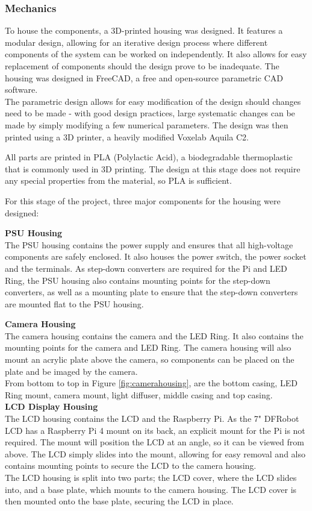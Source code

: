 \subsubsection{Mechanics} \label{sec:mechanics}
To house the components, a 3D-printed housing was designed. It features a modular design, allowing for an iterative design process
where different components of the system can be worked on independently. It also allows for easy replacement of components
should the design prove to be inadequate. The housing was designed in FreeCAD\cite{freecad}, a free and open-source parametric CAD software. \\
The parametric design allows for easy modification of the design should changes need to be made -
with good design practices, large systematic changes can be made by simply modifying a few numerical parameters.
The design was then printed using a 3D printer, a heavily modified Voxelab Aquila C2. 

All parts are printed in PLA (Polylactic Acid), a biodegradable thermoplastic that is commonly used in 3D printing. The design
at this stage does not require any special properties from the material, so PLA is sufficient.

For this stage of the project, three major components for the housing were designed:

\noindent
\textbf{PSU Housing} \\
The PSU housing contains the power supply and ensures that all high-voltage components are safely enclosed.
It also houses the power switch, the power socket and the terminals. As step-down converters are required for the Pi and LED Ring,
the PSU housing also contains mounting points for the step-down converters, as well as a mounting plate to ensure that the step-down converters
are mounted flat to the PSU housing.

\noindent
\textbf{Camera Housing}
\label{sec:camerahousing} \\
The camera housing contains the camera and the LED Ring. It also contains the mounting points for the camera and LED Ring.
The camera housing will also mount an acrylic plate above the camera, so components can be placed on the plate and be imaged by the camera. \\
From bottom to top in Figure \ref{fig:camerahousing}, are the bottom casing, LED Ring mount, camera mount, light diffuser, middle casing and
top casing. \\

\noindent
\textbf{LCD Display Housing}
\label{sec:lcdhousing} \\
The LCD housing contains the LCD and the Raspberry Pi. As the 7" DFRobot LCD has a Raspberry Pi 4 mount on its back,
an explicit mount for the Pi is not required. The mount will position the LCD at an angle, so it can be viewed from above. The LCD
simply slides into the mount, allowing for easy removal and also contains mounting points to secure the LCD to the camera housing. \\
The LCD housing is split into two parts; the LCD cover, where the LCD slides into, and a base plate, which mounts to the camera housing.
The LCD cover is then mounted onto the base plate, securing the LCD in place.

